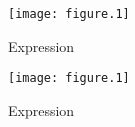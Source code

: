 \documentclass{article}
\begin{document}
\begin{figure}[ht]
  \centering
  \texttt{[image: figure.1]}
  \caption{Expression}
\end{figure}

\begin{figure}[ht]
  \centering
  \texttt{[image: figure.1]}
  \caption{Expression}
\end{figure}


\clearpage
\end{document}
